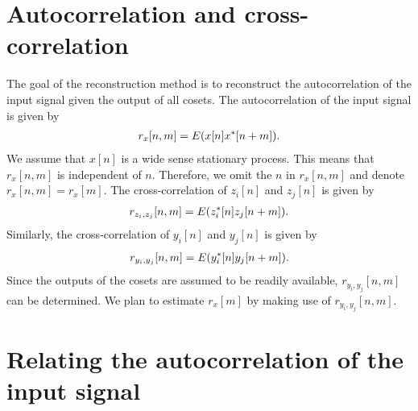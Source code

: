\documentclass[a4paper, openany, oneside]{memoir}
\begin{document}
\section{Autocorrelation and cross-correlation}
The goal of the reconstruction method is to reconstruct the autocorrelation of the input signal given the output of all cosets. The autocorrelation of the input signal is given by
\begin{align*}
    r_x[n,m] = E(x[n]x^*[n+m]).
\end{align*}
We assume that $x[n]$ is a wide sense stationary process. This means that $r_x[n,m]$ is independent of $n$. Therefore, we omit the $n$ in $r_x[n,m]$ and denote $r_x[n,m]=r_x[m]$. The cross-correlation of $z_i[n]$ and $z_j[n]$ is given by
\begin{align*}
    r_{z_i,z_j}[n,m]=E(z^*_i[n]z_j[n+m]).
\end{align*}
Similarly, the cross-correlation of $y_i[n]$ and $y_j[n]$ is given by
\begin{align*}
    r_{y_i,y_j}[n,m]=E(y^*_i[n]y_j[n+m]).
\end{align*}
Since the outputs of the cosets are assumed to be readily available, $r_{y_i,y_j}[n,m]$ can be determined. We plan to estimate $r_x[m]$ by making use of $r_{y_i,y_j}[n,m]$.

\section{Relating the autocorrelation of the input signal}
\end{document}
